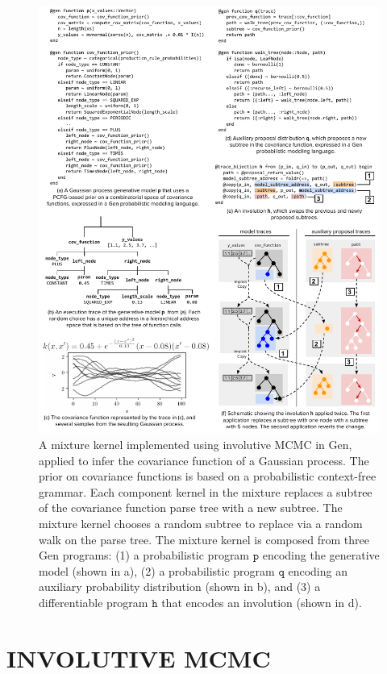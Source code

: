 \documentclass[twoside]{article}
\begin{document}
\begin{figure}[ht]
    \centering
    \includegraphics[width=\textwidth]{figures/structure-learning.pdf}
    \caption{
A mixture kernel implemented using involutive MCMC in Gen, applied to infer the covariance function of a Gaussian process.
The prior on covariance functions is based on a probabilistic context-free grammar.
Each component kernel in the mixture replaces a subtree of the covariance function parse tree with a new subtree.
The mixture kernel chooses a random subtree to replace via a random walk on the parse tree.
The mixture kernel is composed from three Gen programs:
(1) a probabilistic program $\mathtt{p}$ encoding the generative model (shown in a),
(2) a probabilistic program $\mathtt{q}$ encoding an auxiliary probability distribution (shown in b), and
(3) a differentiable program $\mathtt{h}$ that encodes an involution (shown in d).
}
    \label{fig:structure-learning}
\end{figure}

\section{INVOLUTIVE MCMC}
\end{document}
